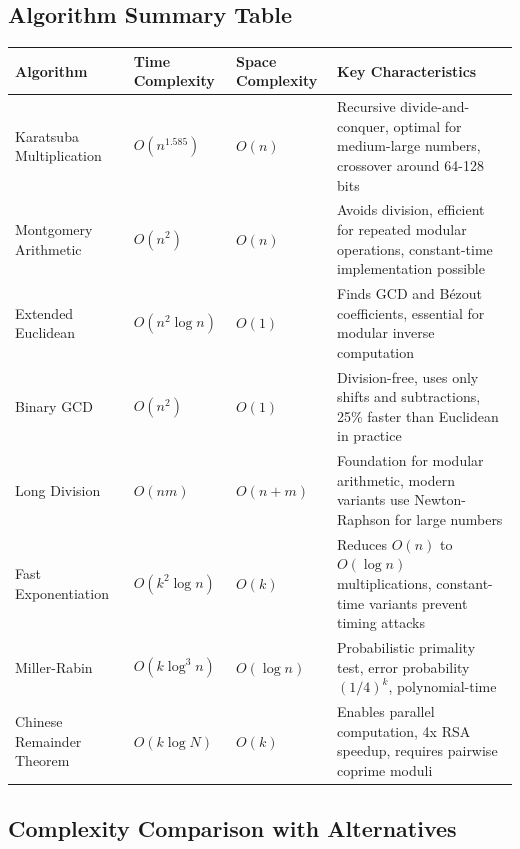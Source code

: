 \documentclass[12pt,a4paper]{article}
\theoremstyle{definition}
\begin{document}
\subsection{Algorithm Summary Table}

\begin{longtable}{|p{3cm}|p{2cm}|p{3cm}|p{6cm}|}
\hline
\textbf{Algorithm} & \textbf{Time Complexity} & \textbf{Space Complexity} & \textbf{Key Characteristics} \\
\hline
Karatsuba Multiplication & $O(n^{1.585})$ & $O(n)$ & Recursive divide-and-conquer, optimal for medium-large numbers, crossover around 64-128 bits \\
\hline
Montgomery Arithmetic & $O(n^2)$ & $O(n)$ & Avoids division, efficient for repeated modular operations, constant-time implementation possible \\
\hline
Extended Euclidean & $O(n^2 \log n)$ & $O(1)$ & Finds GCD and Bézout coefficients, essential for modular inverse computation \\
\hline
Binary GCD & $O(n^2)$ & $O(1)$ & Division-free, uses only shifts and subtractions, 25\% faster than Euclidean in practice \\
\hline
Long Division & $O(nm)$ & $O(n+m)$ & Foundation for modular arithmetic, modern variants use Newton-Raphson for large numbers \\
\hline
Fast Exponentiation & $O(k^2 \log n)$ & $O(k)$ & Reduces $O(n)$ to $O(\log n)$ multiplications, constant-time variants prevent timing attacks \\
\hline
Miller-Rabin & $O(k \log^3 n)$ & $O(\log n)$ & Probabilistic primality test, error probability $(1/4)^k$, polynomial-time \\
\hline
Chinese Remainder Theorem & $O(k \log N)$ & $O(k)$ & Enables parallel computation, 4x RSA speedup, requires pairwise coprime moduli \\
\hline
\end{longtable}

\subsection{Complexity Comparison with Alternatives}
\end{document}

